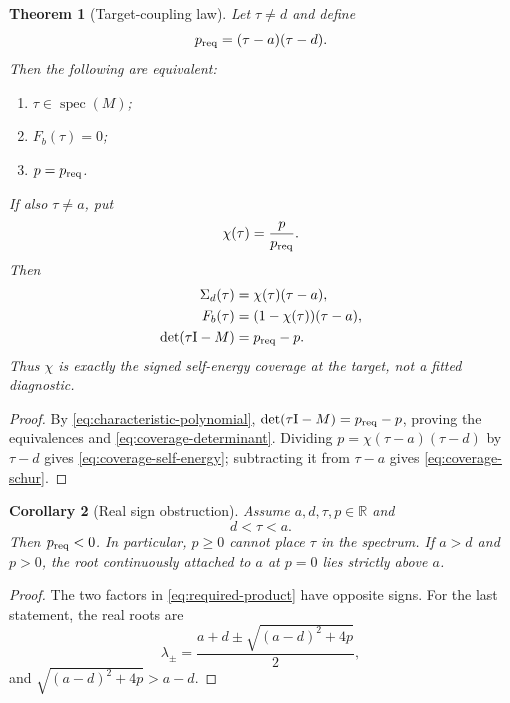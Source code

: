 \documentclass[11pt]{article}
\newtheorem{theorem}{Theorem}[section]
\newtheorem{corollary}[theorem]{Corollary}
\theoremstyle{definition}
\theoremstyle{remark}
\newcommand{\R}{\mathbb R}
\newcommand{\Id}{\mathrm I}
\newcommand{\spec}{\operatorname{spec}}
\begin{document}
\begin{theorem}[Target-coupling law]
\label{thm:target-coupling}
Let $\tau\ne d$ and define
\begin{equation}\label{eq:required-product}
 p_{\rm req}=(\tau-a)(\tau-d).
\end{equation}
Then the following are equivalent:
\begin{enumerate}[label=(\roman*),leftmargin=2.4em]
 \item $\tau\in\spec(M)$;
 \item $F_b(\tau)=0$;
 \item $p=p_{\rm req}$.
\end{enumerate}
If also $\tau\ne a$, put
\begin{equation}\label{eq:coverage-ratio}
 \chi(\tau)=\frac{p}{p_{\rm req}}.
\end{equation}
Then
\begin{align}
 \Sigma_d(\tau)&=\chi(\tau)(\tau-a),
 \label{eq:coverage-self-energy}\\
 F_b(\tau)&=(1-\chi(\tau))(\tau-a),
 \label{eq:coverage-schur}\\
 \det(\tau\Id-M)&=p_{\rm req}-p.
 \label{eq:coverage-determinant}
\end{align}
Thus $\chi$ is exactly the signed self-energy coverage at the target, not a
fitted diagnostic.
\end{theorem}

\begin{proof}
By \eqref{eq:characteristic-polynomial},
$\det(\tau\Id-M)=p_{\rm req}-p$, proving the equivalences and
\eqref{eq:coverage-determinant}.  Dividing
$p=\chi(\tau-a)(\tau-d)$ by $\tau-d$ gives
\eqref{eq:coverage-self-energy}; subtracting it from $\tau-a$ gives
\eqref{eq:coverage-schur}.
\end{proof}

\begin{corollary}[Real sign obstruction]
\label{cor:sign-obstruction}
Assume $a,d,\tau,p\in\R$ and
\begin{equation}\label{eq:target-ordering}
 d<\tau<a.
\end{equation}
Then $p_{\rm req}<0$.  In particular, $p\ge0$ cannot place $\tau$ in the
spectrum.  If $a>d$ and $p>0$, the root continuously attached to $a$ at
$p=0$ lies strictly above $a$.
\end{corollary}

\begin{proof}
The two factors in \eqref{eq:required-product} have opposite signs.  For the
last statement, the real roots are
\begin{equation}\label{eq:real-roots-positive-p}
 \lambda_\pm=\frac{a+d\pm\sqrt{(a-d)^2+4p}}{2},
\end{equation}
and $\sqrt{(a-d)^2+4p}>a-d$.
\end{proof}
\end{document}
